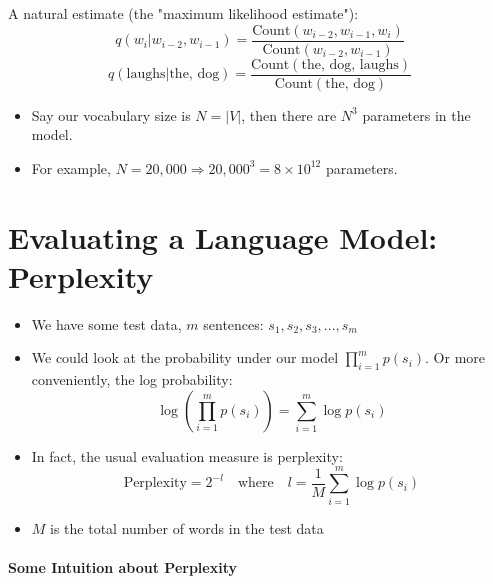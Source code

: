 \documentclass{book}
\begin{document}
    A natural estimate (the "maximum likelihood estimate"):
    \[
        q(w_i | w_{i-2}, w_{i-1}) = \frac{{\text{Count}(w_{i-2}, w_{i-1}, w_i)}}{{\text{Count}(w_{i-2}, w_{i-1})}}
    \]
    \[
        q(\text{laughs} | \text{the, dog}) = \frac{{\text{Count}(\text{the, dog, laughs})}}{{\text{Count}(\text{the, dog})}}
    \]
    \begin{itemize}
     \item     Say our vocabulary size is $N = |V|$, then there are $N^3$ parameters in the model.
     \item     For example, $N = 20,000 \Rightarrow 20,000^3 = 8 \times 10^{12}$ parameters.
    \end{itemize}



\section{Evaluating a Language Model: Perplexity}
  
    \begin{itemize}
        \item We have some test data, $m$ sentences: $s_1, s_2, s_3, ..., s_m$
        \item We could look at the probability under our model $\prod_{i=1}^{m} p(s_i)$. Or more conveniently, the log probability:
        \[
            \log \left( \prod_{i=1}^{m} p(s_i) \right) = \sum_{i=1}^{m} \log p(s_i)
        \]
        \item In fact, the usual evaluation measure is perplexity:
        \[
            \text{Perplexity} = 2^{-l} \quad \text{where} \quad l = \frac{1}{M} \sum_{i=1}^{m} \log p(s_i)
        \]
        \item $M$ is the total number of words in the test data
    \end{itemize}


\paragraph{Some Intuition about Perplexity}
\end{document}
